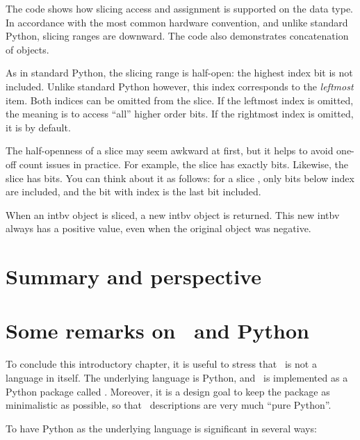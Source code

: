 The code shows how slicing access and assignment is supported on the
 data type. In accordance with the most common hardware
convention, and unlike standard Python, slicing ranges are
downward. The code also demonstrates concatenation of 
objects.

As in standard Python, the slicing range is half-open: the highest
index bit is not included. Unlike standard Python however, this index
corresponds to the \emph{leftmost} item. Both indices can be omitted
from the slice. If the leftmost index is omitted, the meaning is to
access ``all'' higher order bits.  If the rightmost index is omitted,
it is  by default.

The half-openness of a slice may seem awkward at first, but it helps
to avoid one-off count issues in practice. For example, the slice
 has exactly  bits. Likewise, the slice
 has  bits. You can think about it as
follows: for a slice \code{[i:j]}, only bits below index  are
included, and the bit with index  is the last bit included.

When an intbv object is sliced, a new intbv object is returned. This
new intbv always has a positive value, even when the original object
was negative.

\section{Summary and perspective}


\section{Some remarks on \myhdl\ and Python \label{intro-python}}

To conclude this introductory chapter, it is useful to stress that
\myhdl\ is not a language in itself. The underlying language is Python, 
and \myhdl\ is implemented as a Python package called .
Moreover, it is a design goal to keep the  package as
minimalistic as possible, so that \myhdl\ descriptions are very much
``pure Python''.

To have Python as the underlying language is significant in several
ways:


